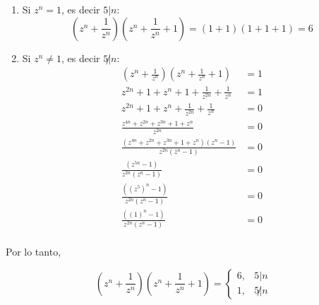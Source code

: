 \begin{problema}
\begin{sol}
        \begin{enumerate}
            \item Si $z^n =1$, es decir $5|n$: 
                $$\left(z^{n}+\frac{1}{z^{n}}\right)\left(z^{n}+\frac{1}{z^{n}}+1\right)= (1+1)(1+1+1) =6$$
            \item Si $z^n \neq 1$, es decir $5\not |n$: 
            \begin{align*}
                \left(z^{n}+\frac{1}{z^{n}}\right)\left(z^{n}+\frac{1}{z^{n}}+1\right) & = 1\\
                z^{2n}+1+z^n+1+\frac{1}{z^{2n}} + \frac{1}{z^n} &= 1 \\
                z^{2n}+1+z^n+\frac{1}{z^{2n}} + \frac{1}{z^n} &= 0 \\
                \frac{z^{4n}+z^{2n}+z^{3n}+1+z^n}{z^{2n}}&= 0\\
                \frac{(z^{4n}+z^{2n}+z^{3n}+1+z^n)(z^{n}-1)}{z^{2n}(z^{n}-1)}&= 0\\
                \frac{(z^{5n}-1)}{z^{2n}(z^{n}-1)}&= 0\\
                \frac{((z^{5})^n-1)}{z^{2n}(z^{n}-1)}&= 0\\
                \frac{((1)^n-1)}{z^{2n}(z^{n}-1)}&= 0\\
            \end{align*}
        \end{enumerate}

        Por lo tanto, 

        $$\left(z^{n}+\frac{1}{z^{n}}\right)\left(z^{n}+\frac{1}{z^{n}}+1\right)=\begin{cases}
            6, &  5|n\\
            1, & 5\not|n
        \end{cases}$$
        
    \end{sol}
\end{problema}



%
%

